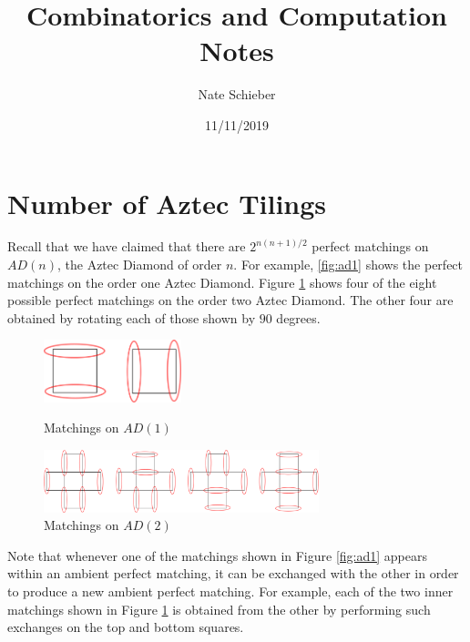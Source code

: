 \documentclass{article}
\begin{document}
	
	\title{Combinatorics and Computation Notes}
	\author{Nate Schieber}
	\date{11/11/2019}
	\maketitle
	
	\section{Number of Aztec Tilings}
	
	\hspace{1cm} Recall that we have claimed that there are $2^{n(n+1)/2}$ perfect matchings on $AD(n)$, the Aztec Diamond of order $n$. For example, \ref{fig:ad1} shows the perfect matchings on the order one Aztec Diamond. Figure \ref{fig:ad2} shows four of the eight possible perfect matchings on the order two Aztec Diamond. The other four are obtained by rotating each of those shown by $90$ degrees. 

\begin{figure}[h]
\begin{minipage}{.4\textwidth}
	\begin{center}
 	\includegraphics[width=4cm]{order_1_matchings.png}
  	\caption{Matchings on $AD(1)$}
	 \label{fig:ad1}
 	 \end{center}
 \end{minipage}	
 \hspace{1cm}
 \begin{minipage}{.4\textwidth}
 	\begin{center}
 	\includegraphics[width=8cm]{order_2_matchings.png}
  	\caption{Matchings on $AD(2)$}
	 \label{fig:ad2}
 	 \end{center}
  \end{minipage}
\end{figure} 

\hspace{1cm} Note that whenever one of the matchings shown in Figure \ref{fig:ad1} appears within an ambient perfect matching, it can be exchanged with the other in order to produce a new ambient perfect matching. For example, each of the two inner matchings shown in Figure \ref{fig:ad2} is obtained from the other by performing such exchanges on the top and bottom squares. 
\end{document}
